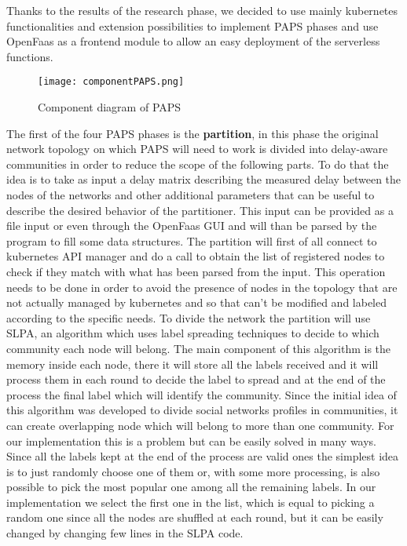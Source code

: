 Thanks to the results of the research phase, we decided to use mainly kubernetes functionalities
and extension possibilities to implement PAPS phases and use OpenFaas as a frontend module to 
allow an easy deployment of the serverless functions.
\begin{figure}[h]
    \texttt{[image: componentPAPS.png]}
    \label{fig:component}
    \caption{Component diagram of PAPS}
\end{figure}

The first of the four PAPS phases is the \textbf{partition}, in this phase the original 
network topology on which PAPS will need to work is divided into delay-aware communities in 
order to reduce the scope of the following parts. To do that the idea is to take as input a 
delay matrix describing the measured delay between the nodes of the networks and other 
additional parameters that can be useful to describe the desired behavior of the partitioner.
This input can be provided as a file input or even through the OpenFaas GUI and will than be
parsed by the program to fill some data structures. The partition will first of all connect to 
kubernetes API manager and do a call to obtain the list of registered nodes to check if they 
match with what has been parsed from the input. This operation needs to be done in order to
avoid the presence of nodes in the topology that are not actually managed by kubernetes and 
so that can't be modified and labeled according to the specific needs. 
To divide the network the partition will use SLPA, an algorithm which uses label spreading 
techniques to decide to which community each node will belong. The main component of this 
algorithm is the memory inside each node, there it will store all the labels received and 
it will process them in each round to decide the label to spread and at the end of the 
process the final label which will identify the community. Since the initial idea of this 
algorithm was developed to divide social networks profiles in communities, it can create 
overlapping node which will belong to more than one community. 
For our implementation this
is a problem but can be easily solved in many ways. Since all the labels kept at the end 
of the process are valid ones the simplest idea is to just randomly choose one of them or,
with some more processing, is also possible to pick the most popular one among all the 
remaining labels. In our implementation we select the first one in the list, which is 
equal to picking a random one since all the nodes are shuffled at each round, but it can 
be easily changed by changing few lines in the SLPA code.



